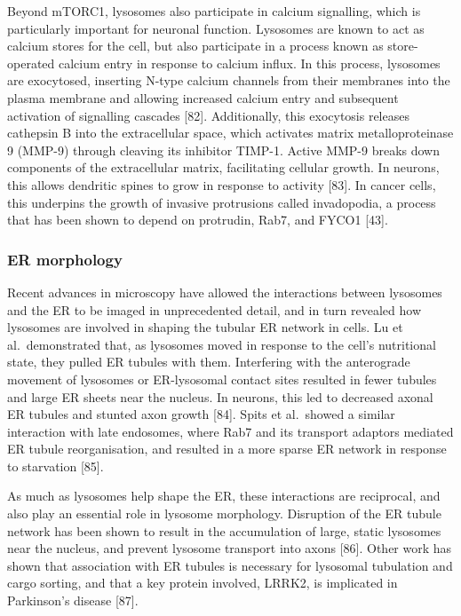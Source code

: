 \documentclass[
  12pt,
  a4paper,
]{book}
\begin{document}
Beyond mTORC1, lysosomes also participate in calcium signalling, which is particularly important for neuronal function. Lysosomes are known to act as calcium stores for the cell, but also participate in a process known as store-operated calcium entry in response to calcium influx. In this process, lysosomes are exocytosed, inserting N-type calcium channels from their membranes into the plasma membrane and allowing increased calcium entry and subsequent activation of signalling cascades {[}82{]}. Additionally, this exocytosis releases cathepsin B into the extracellular space, which activates matrix metalloproteinase 9 (MMP-9) through cleaving its inhibitor TIMP-1. Active MMP-9 breaks down components of the extracellular matrix, facilitating cellular growth. In neurons, this allows dendritic spines to grow in response to activity {[}83{]}. In cancer cells, this underpins the growth of invasive protrusions called invadopodia, a process that has been shown to depend on protrudin, Rab7, and FYCO1 {[}43{]}.

\hypertarget{er-morphology}{%
\subsubsection{ER morphology}\label{er-morphology}}

Recent advances in microscopy have allowed the interactions between lysosomes and the ER to be imaged in unprecedented detail, and in turn revealed how lysosomes are involved in shaping the tubular ER network in cells. Lu et al.~demonstrated that, as lysosomes moved in response to the cell's nutritional state, they pulled ER tubules with them. Interfering with the anterograde movement of lysosomes or ER-lysosomal contact sites resulted in fewer tubules and large ER sheets near the nucleus. In neurons, this led to decreased axonal ER tubules and stunted axon growth {[}84{]}. Spits et al.~showed a similar interaction with late endosomes, where Rab7 and its transport adaptors mediated ER tubule reorganisation, and resulted in a more sparse ER network in response to starvation {[}85{]}.

As much as lysosomes help shape the ER, these interactions are reciprocal, and also play an essential role in lysosome morphology. Disruption of the ER tubule network has been shown to result in the accumulation of large, static lysosomes near the nucleus, and prevent lysosome transport into axons {[}86{]}. Other work has shown that association with ER tubules is necessary for lysosomal tubulation and cargo sorting, and that a key protein involved, LRRK2, is implicated in Parkinson's disease {[}87{]}.
\end{document}
